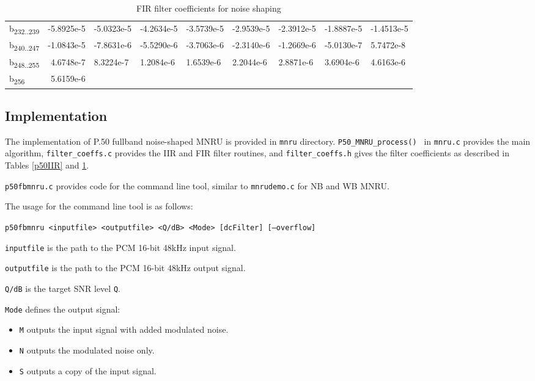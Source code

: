 \begin{table}
{\begin{tabular}{lrlllllll}
        b\textsubscript{232..239} & -5.8925e-5 & -5.0323e-5 & -4.2634e-5 & -3.5739e-5 & -2.9539e-5 & -2.3912e-5 & -1.8887e-5 & -1.4513e-5 \\
        b\textsubscript{240..247} & -1.0843e-5 & -7.8631e-6 & -5.5290e-6 & -3.7063e-6 & -2.3140e-6 & -1.2669e-6 & -5.0130e-7 & 5.7472e-8 \\
        b\textsubscript{248..255} & 4.6748e-7 & 8.3224e-7 & 1.2084e-6 & 1.6539e-6 & 2.2044e-6 & 2.8871e-6 & 3.6904e-6 & 4.6163e-6 \\
        b\textsubscript{256} & 5.6159e-6 &  &  &  &  &  &  &  \\
    \end{tabular}}
    \caption{FIR filter coefficients for noise shaping}
    \label{p50FIR}
\end{table}

\subsection {Implementation}

The implementation of P.50 fullband noise-shaped MNRU is provided in {\tt mnru} directory.
{\tt P50\_MNRU\_process() } in {\tt mnru.c} provides the main algorithm,
{\tt filter\_coeffs.c} provides the IIR and FIR filter routines,
and {\tt filter\_coeffs.h} gives the filter coefficients as described in Tables \ref{p50IIR} and \ref{p50FIR}.

{\tt p50fbmnru.c} provides code for the command line tool, similar to {\tt mnrudemo.c} for NB and WB MNRU.

The usage for the command line tool is as follows:

{\tt p50fbmnru <inputfile> <outputfile> <Q/dB> <Mode> [dcFilter] [--overflow]}

{\tt inputfile} is the path to the PCM 16-bit 48kHz input signal.

{\tt outputfile} is the path to the PCM 16-bit 48kHz output signal.

{\tt Q/dB} is the target SNR level {\tt Q}.


{\tt Mode} defines the output signal:
\begin{itemize}
    \item {\tt M} outputs the input signal with added modulated noise.
    \item {\tt N} outputs the modulated noise only.
    \item {\tt S} outputs a copy of the input signal.
\end{itemize}

